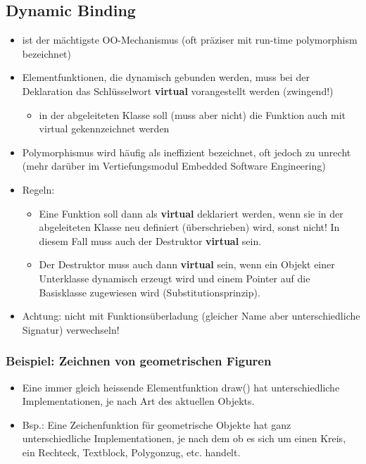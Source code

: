 \subsection{Dynamic Binding}
\begin{itemize}
	\item ist der mächtigste OO-Mechanismus (oft präziser mit run-time polymorphism bezeichnet)
	\item Elementfunktionen, die dynamisch gebunden werden, muss bei der Deklaration das Schlüsselwort \textbf{virtual} vorangestellt werden (zwingend!)
	\begin{itemize}
		\item in der abgeleiteten Klasse soll (muss aber nicht) die Funktion auch mit virtual gekennzeichnet werden
	\end{itemize}
	\item Polymorphismus wird häufig als ineffizient bezeichnet, oft jedoch zu unrecht (mehr darüber im Vertiefungsmodul Embedded Software Engineering)
	\item Regeln:
	\begin{itemize}
		\item Eine Funktion soll dann als \textbf{virtual} deklariert werden, wenn sie in der abgeleiteten Klasse neu definiert (überschrieben) wird, sonst nicht! In diesem Fall muss auch der Destruktor \textbf{virtual} sein.
		\item Der Destruktor muss auch dann \textbf{virtual} sein, wenn ein Objekt einer Unterklasse dynamisch erzeugt wird und einem Pointer auf die Basisklasse zugewiesen wird (Substitutionsprinzip).
	\end{itemize}
	\item Achtung: nicht mit Funktionsüberladung (gleicher Name aber unterschiedliche Signatur) verwechseln!
\end{itemize}

\subsubsection{Beispiel: Zeichnen von geometrischen Figuren}
\begin{itemize}
	\item Eine immer gleich heissende Elementfunktion draw() hat unterschiedliche Implementationen, je nach Art des aktuellen Objekts.
	\item Bsp.: Eine Zeichenfunktion für geometrische Objekte hat ganz unterschiedliche Implementationen, je nach dem ob es sich um einen Kreis, ein Rechteck, Textblock, Polygonzug, etc. handelt.
\end{itemize}

